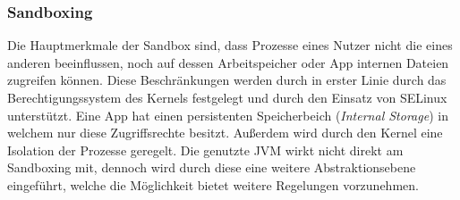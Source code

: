 	\subsubsection{Sandboxing}
	Die Hauptmerkmale der Sandbox sind, dass Prozesse eines Nutzer nicht die eines anderen beeinflussen, noch auf dessen Arbeitspeicher oder App internen Dateien zugreifen können. Diese Beschränkungen werden durch in erster Linie durch das Berechtigungssystem des Kernels festgelegt und durch den Einsatz von SELinux unterstützt. Eine App hat einen persistenten Speicherbeich (\textit{Internal Storage}) in welchem nur diese Zugriffsrechte besitzt. Außerdem wird durch den Kernel eine Isolation der Prozesse geregelt. Die genutzte JVM wirkt nicht direkt am Sandboxing mit, dennoch wird durch diese eine weitere Abstraktionsebene eingeführt, welche die Möglichkeit bietet weitere Regelungen vorzunehmen. %
	

